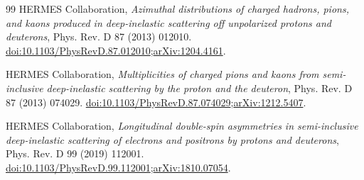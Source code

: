 \documentclass[11pt,a4paper]{article}
\begin{document}
\begin{thebibliography}{99}
 HERMES Collaboration,
\emph{Azimuthal distributions of charged hadrons, pions, and kaons produced in deep-inelastic scattering off unpolarized protons and deuterons},
Phys. Rev. D 87 (2013) 012010.
\href{https://doi.org/10.1103/PhysRevD.87.012010}{doi:10.1103/PhysRevD.87.012010};\quad\href{https://arxiv.org/abs/1204.4161}{arXiv:1204.4161}.

 HERMES Collaboration,
\emph{Multiplicities of charged pions and kaons from semi-inclusive deep-inelastic scattering by the proton and the deuteron},
Phys. Rev. D 87 (2013) 074029.
\href{https://doi.org/10.1103/PhysRevD.87.074029}{doi:10.1103/PhysRevD.87.074029};\quad\href{https://arxiv.org/abs/1212.5407}{arXiv:1212.5407}.

 HERMES Collaboration,
\emph{Longitudinal double-spin asymmetries in semi-inclusive deep-inelastic scattering of electrons and positrons by protons and deuterons},
Phys. Rev. D 99 (2019) 112001.
\href{https://doi.org/10.1103/PhysRevD.99.112001}{doi:10.1103/PhysRevD.99.112001};\quad\href{https://arxiv.org/abs/1810.07054}{arXiv:1810.07054}.
\end{thebibliography}
\end{document}
